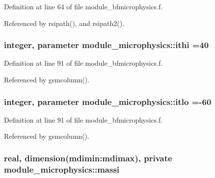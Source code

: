 Definition at line 64 of file module\+\_\+bfmicrophysics.\+f.



Referenced by rsipath(), and rsipath2().

\subsubsection[{\texorpdfstring{ithi}{ithi}}]{\setlength{\rightskip}{0pt plus 5cm}integer, parameter module\+\_\+microphysics\+::ithi =40}\hypertarget{namespacemodule__microphysics_aac47e36935bcfaf088e6d0cb266d74f5}{}\label{namespacemodule__microphysics_aac47e36935bcfaf088e6d0cb266d74f5}


Definition at line 91 of file module\+\_\+bfmicrophysics.\+f.



Referenced by gsmcolumn().

\subsubsection[{\texorpdfstring{itlo}{itlo}}]{\setlength{\rightskip}{0pt plus 5cm}integer, parameter module\+\_\+microphysics\+::itlo =-\/60}\hypertarget{namespacemodule__microphysics_ada649157311835e0fa4c4d24057d5aa4}{}\label{namespacemodule__microphysics_ada649157311835e0fa4c4d24057d5aa4}


Definition at line 91 of file module\+\_\+bfmicrophysics.\+f.



Referenced by gsmcolumn().

\subsubsection[{\texorpdfstring{massi}{massi}}]{\setlength{\rightskip}{0pt plus 5cm}real, dimension(mdimin\+:mdimax), private module\+\_\+microphysics\+::massi\hspace{0.3cm}{\ttfamily [private]}}\hypertarget{namespacemodule__microphysics_a399ef7965cf1f4f6e4aef482e33f9b16}{}\label{namespacemodule__microphysics_a399ef7965cf1f4f6e4aef482e33f9b16}



